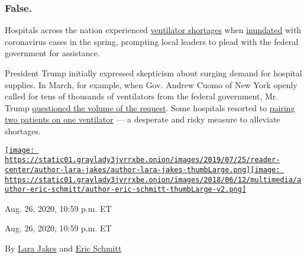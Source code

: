 \hypertarget{false}{%
\subsubsection{False.}\label{false}}

Hospitals across the nation experienced
\href{https://www.nejm.org/doi/full/10.1056/NEJMp2006141}{ventilator
shortages} when
\href{https://www.nytimes3xbfgragh.onion/2020/03/31/us/coronavirus-covid-triage-rationing-ventilators.html}{inundated}
with coronavirus cases in the spring, prompting local leaders to plead
with the federal government for assistance.

President Trump initially expressed skepticism about surging demand for
hospital supplies. In March, for example, when Gov. Andrew Cuomo of New
York openly called for tens of thousands of ventilators from the federal
government, Mr. Trump
\href{https://thehill.com/homenews/administration/489789-trump-questions-need-for-30000-ventilators-in-new-york}{questioned
the volume of the request}. Some hospitals resorted to
\href{https://www.nytimes3xbfgragh.onion/2020/03/26/health/coronavirus-ventilator-sharing.html}{pairing
two patients on one ventilator} --- a desperate and risky measure to
alleviate shortages.

\href{https://www.nytimes3xbfgragh.onion/by/lara-jakes}{\texttt{[image: https://static01.graylady3jvrrxbe.onion/images/2019/07/25/reader-center/author-lara-jakes/author-lara-jakes-thumbLarge.png]}}\href{https://www.nytimes3xbfgragh.onion/by/eric-schmitt}{\texttt{[image: https://static01.graylady3jvrrxbe.onion/images/2018/06/12/multimedia/author-eric-schmitt/author-eric-schmitt-thumbLarge-v2.png]}}

Aug. 26, 2020, 10:59 p.m. ET

Aug. 26, 2020, 10:59 p.m. ET

By \href{https://www.nytimes3xbfgragh.onion/by/lara-jakes}{Lara Jakes}
and \href{https://www.nytimes3xbfgragh.onion/by/eric-schmitt}{Eric
Schmitt}


